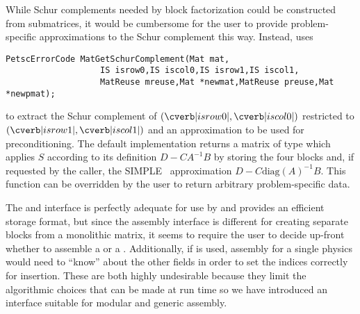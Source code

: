While Schur complements needed by block factorization could be constructed from submatrices, it would be cumbersome for the user to provide problem-specific approximations to the Schur complement this way.
Instead,  uses
\begin{verbatim}
PetscErrorCode MatGetSchurComplement(Mat mat,
                   IS isrow0,IS iscol0,IS isrow1,IS iscol1,
                   MatReuse mreuse,Mat *newmat,MatReuse preuse,Mat *newpmat);
\end{verbatim}
to extract the Schur complement of $(\cverb|isrow0|,\cverb|iscol0|)$ restricted to $(\cverb|isrow1|,\cverb|iscol1|)$ and an approximation to be used for preconditioning.
The default implementation returns a matrix of type  which applies $S$ according to its definition $D - CA^{-1}B$ by storing the four blocks and, if requested by the caller, the SIMPLE~\cite{patankar1972cph} approximation $D - C\text{diag}(A)^{-1}B$.
This function can be overridden by the user to return arbitrary problem-specific data.

The  and  interface is perfectly adequate for use by  and  provides an efficient storage format, but since the assembly interface is different for creating separate blocks from a monolithic matrix, it seems to require the user to decide up-front whether to assemble a  or a .
Additionally, if  is used, assembly for a single physics would need to ``know'' about the other fields in order to set the indices correctly for insertion.
These are both highly undesirable because they limit the algorithmic choices that can be made at run time so we have introduced an interface suitable for modular and generic assembly.

